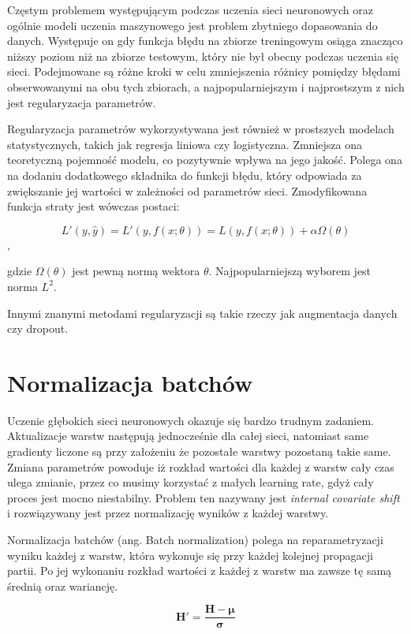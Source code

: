 \documentclass[licencjacka]{pracamgr}
\begin{document}
Częstym problemem występującym podczas uczenia sieci neuronowych oraz ogólnie modeli uczenia maszynowego jest problem zbytniego dopasowania do danych. Występuje on gdy funkcja błędu na zbiorze treningowym osiąga znacząco niższy poziom niż na zbiorze testowym, który nie był obecny podczas uczenia się sieci. Podejmowane są różne kroki w celu zmniejszenia różnicy pomiędzy błędami obserwowanymi na obu tych zbiorach, a najpopularniejszym i najprostszym z nich jest regularyzacja parametrów.

Regularyzacja parametrów wykorzystywana jest również w prostszych modelach statystycznych, takich jak regresja liniowa czy logistyczna. Zmniejsza ona teoretyczną pojemność modelu, co pozytywnie wpływa na jego jakość. Polega ona na dodaniu dodatkowego składnika do funkcji błędu, który odpowiada za zwiększanie jej wartości w zależności od parametrów sieci. Zmodyfikowana funkcja straty jest wówczas postaci:

$$ L'(y, \hat{y}) = L'(y, f(x; \theta)) = L(y, f(x; \theta)) + \alpha \Omega(\theta) $$, 

gdzie $ \Omega(\theta) $ jest pewną normą wektora $ \theta $. Najpopularniejszą wyborem jest norma $ L^2 $.

Innymi znanymi metodami regularyzacji są takie rzeczy jak augmentacja danych czy dropout.

\section{Normalizacja batchów}

Uczenie głębokich sieci neuronowych okazuje się bardzo trudnym zadaniem. Aktualizacje warstw następują jednocześnie dla całej sieci, natomiast same gradienty liczone są przy założeniu że pozostałe warstwy pozostaną takie same. Zmiana parametrów powoduje iż rozkład wartości dla każdej z warstw cały czas ulega zmianie, przez co musimy korzystać z małych learning rate, gdyż cały proces jest mocno niestabilny. Problem ten nazywany jest \emph{internal covariate shift} i rozwiązywany jest przez normalizację wyników z każdej warstwy. 

Normalizacja batchów (ang. Batch normalization) polega na reparametryzacji wyniku każdej z warstw, która wykonuje się przy każdej kolejnej propagacji partii. Po jej wykonaniu rozkład wartości z każdej z warstw ma zawsze tę samą średnią oraz wariancję.

$$ \mathbf{H'} = \frac{\mathbf{H} - \mathbf{\mu}}{\mathbf{\sigma}} $$
\end{document}
